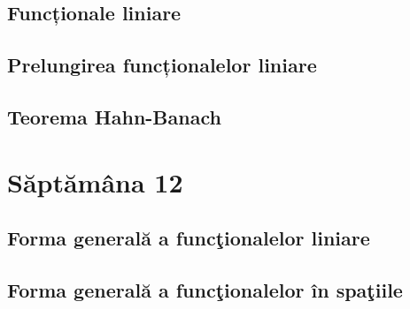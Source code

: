 \documentclass[a4paper,12pt]{article}
\theoremstyle{change}
\begin{document}

\subsection{Funcționale liniare}


\subsection{Prelungirea funcționalelor liniare}

\subsection{Teorema Hahn-Banach}

\section{Săptămâna 12}


\subsection{Forma generală a funcţionalelor liniare}


\subsection{Forma generală a funcţionalelor în spaţiile }
\end{document}
